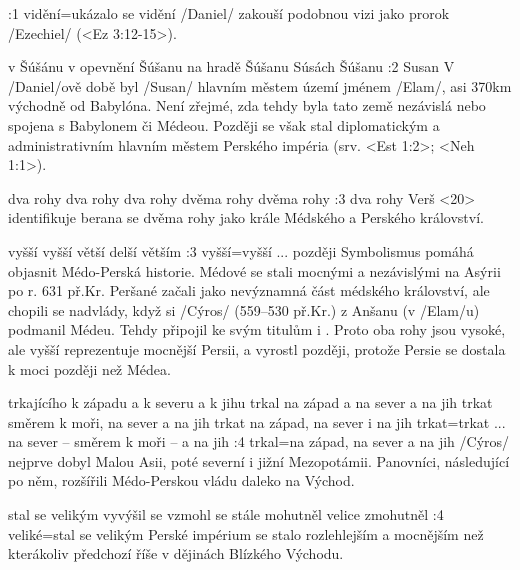 :1 {vidění}={ukázalo se vidění} \x/Daniel/ zakouší podobnou  vizi jako prorok \x/Ezechiel/ (<Ez 3:12-15>).

   {v Šúšánu}   %
   {v opevnění Šúšanu}   %
   {na hradě Šúšanu}   %
   {Súsách}   %
   {Šúšanu}   %
:2 {Susan} V \x/Daniel/ově době byl \x/Susan/ hlavním městem území jménem \x/Elam/,  
asi 370km východně od Babylóna. Není zřejmé, zda tehdy byla  tato země  nezávislá nebo spojena s Babylonem či Médeou. Později se však stal diplomatickým a administrativním hlavním městem Perského impéria (srv. <Est 1:2>; <Neh 1:1>).



    {dva rohy} %
    {dva rohy}  %
    {dva rohy} %
    {dvěma rohy}  %
    {dvěma rohy}  %
:3 {dva rohy} Verš <20> identifikuje berana se dvěma rohy jako krále Médského a Perského království.

    {vyšší} %
    {vyšší}  %
    {větší} %
    {delší}  %
    {větším}  %
:3 {vyšší}={vyšší ... později} Symbolismus pomáhá objasnit Médo-Perská historie. Médové se stali mocnými a nezávislými na Asýrii po r. 631 př.Kr. Peršané začali jako nevýznamná část médského království, ale chopili se nadvlády, když si \x/Cýros/ (559--530 př.Kr.) z Anšanu (v \x/Elam/u) podmanil Médeu. Tehdy připojil ke svým titulům i . Proto oba rohy jsou vysoké, ale vyšší reprezentuje mocnější Persii, a vyrostl později, protože Persie se dostala k moci později než Médea.

   {trkajícího k západu a k severu a k jihu}   %
   {trkal na západ a na sever a na jih}   %
   {trkat směrem k moři, na sever a na jih}   %
   {trkat na západ, na sever i na jih}   %
   {trkat}={trkat ... na sever -- směrem k moři -- a na jih}   %
:4 {trkal}={na západ, na sever a na jih} \x/Cýros/ nejprve dobyl Malou Asii, poté severní i jižní Mezopotámii. Panovníci, následující po něm, rozšířili Médo-Perskou vládu daleko na Východ. 

   {stal se velikým}   %
   {vyvýšil se}   %
   {vzmohl se}   %
   {stále mohutněl}   %
   {velice zmohutněl}   %
:4 {veliké}={stal se velikým} Perské impérium se stalo rozlehlejším a mocnějším než kterákoliv předchozí říše v dějinách Blízkého Východu.

